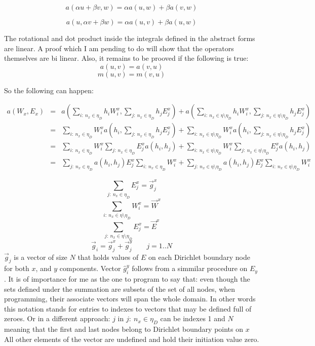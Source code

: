 $$a(\alpha u+\beta v, w)=\alpha a(u,w)+\beta a(v,w)$$

$$a(u,\alpha v+\beta w)=\alpha a(u,v)+\beta a(u,w)$$

The rotational and dot product inside the integrals defined in the abstract forms are linear. A proof which I am pending to do will show that the operators themselves are bi linear.
Also, it remains to be prooved if the following is true:
$$a(u,v) = a(v,u)$$
$$m(u,v) = m(v,u)$$


So the following can happen:

\begin{align}
a\left(W_x,E_x\right)&=& a\left( \sum_{i:\ n_x \in \eta_D} h_i W_i^x, \sum_{j:\ n_x \in \eta_D} h_j E_j^x\right)+a\left(\sum_{i:\ n_x \in \eta\setminus\eta_D} h_i W_i^x,\sum_{j:\ n_x \in \eta\setminus\eta_D} h_j E_j^x\right)\nonumber \\
&=&  \sum_{i:\ n_x \in \eta_D}W_i^x a\left(  h_i , \sum_{j:\ n_x \in \eta_D} h_j E_j^x\right)+\sum_{i:\ n_x \in \eta\setminus\eta_D} W_i^x a\left( h_i,\sum_{j:\ n_x \in \eta\setminus\eta_D} h_j E_j^x\right)\nonumber\\
&=&\sum_{i:\ n_x \in \eta_D}W_i^x \sum_{j:\ n_x \in \eta_D}E_j^x a\left(  h_i ,  h_j \right)+\sum_{i:\ n_x \in \eta\setminus\eta_D} W_i^x \sum_{j:\ n_x \in \eta\setminus\eta_D}  E_j^x a\left( h_i, h_j \right)\nonumber\\
&=& \sum_{j:\ n_x \in \eta_D} a\left(  h_i ,  h_j \right)E_j^x \sum_{i:\ n_x \in \eta_D}W_i^x+\sum_{j:\ n_x \in \eta\setminus\eta_D}   a\left( h_i, h_j \right)E_j^x\sum_{i:\ n_x \in \eta\setminus\eta_D} W_i^x \label{eq:substitution_of_app_fields_in_a}
\end{align}

$$\sum_{j:\ n_x \in \eta_D}E_j^x = \vec{g}_j^x $$
$$\sum_{i:\ n_x \in \eta\setminus\eta_D}W_i^x = \vec{W}^x $$
$$\sum_{j:\ n_x \in \eta\setminus\eta_D}E_j^x = \vec{E}^x $$
$$\vec{g}_i = \vec{g}_j^x+\vec{g}_j^y \qquad j = 1.. N$$
$\vec{g}_j$ is a vector of size $N$ that holds values of $E$ on each Dirichlet boundary node for both $x$, and $y$ components. Vector $\hat{g}_i^y$ follows from a simmilar procedure on $E_y$. It is of importance for me as the one to program to say that: even though the sets defined under the summation are subsets of the set of all nodes, when programming, their associate vectors will span the whole domain. In other words this notation stands for entries to indexes to vectors that may be defined full of zeroes. Or in a different approach: $j$ in $j:\ n_x \in \eta_D$ can be indexes 1 and $N$ meaning that the first and last nodes belong to Dirichlet boundary points on $x$ All other elements of the vector are undefined and hold their initiation value zero.


